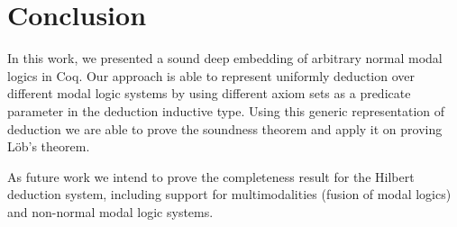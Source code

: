\documentclass[sigconf,anonymous]{acmart}
\begin{document}

\section{Conclusion}\label{sec:conclusion}

In this work, we presented a sound deep embedding of arbitrary
normal modal logics in Coq. Our approach is able to represent uniformly
deduction over different modal logic systems by using different axiom sets
as a predicate parameter in the deduction inductive type. Using this generic
representation of deduction we are able to prove the soundness theorem and
apply it on proving L\"ob's theorem.

As future work we intend to prove the completeness result for the Hilbert
deduction system, including support for multimodalities (fusion of modal logics)
and non-normal modal logic systems.



\end{document}
